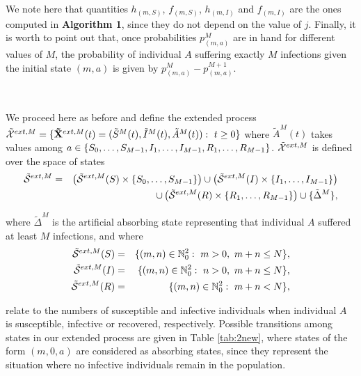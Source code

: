 \documentclass[preprint,12pt]{elsarticle}
\begin{document}
\par\noindent We note here that quantities $h_{(m,S)}$, $f_{(m,S)}$, $h_{(m,I)}$ and $f_{(m,I)}$ are the ones computed in {\bf Algorithm 1}, since they do not depend
on the value of $j$. Finally, it is worth to point out that, once probabilities $p^M_{(m,a)}$ are in hand for different values of $M$, the probability
of individual $A$ suffering exactly $M$ infections given the initial state $(m,a)$ is given by $p^M_{(m,a)}-p^{M+1}_{(m,a)}$.\\

\vspace{0.5cm}

\par{}\\

\par We proceed here as before and define the extended process ${\cal \tilde X}^{ext,M}=\{{\bf \tilde X}^{ext,M}(t)=({\tilde S}^M(t),{\tilde I}^M(t),{\tilde A}^M(t)):\ t\geq0\}$ where
${\tilde A}^M(t)$ takes values among $a\in\{S_0,\dots,S_{M-1},I_1,\dots,I_{M-1},\linebreak R_1,\dots,R_{M-1}\}$. ${\cal \tilde X}^{ext,M}$ is defined over the
space of states
\begin{eqnarray*}
 {\cal \tilde S}^{ext,M} &=& \left({\cal \tilde S}^{ext,M}(S)\times\{S_0,\dots,S_{M-1}\}\right)\cup\left({\cal \tilde S}^{ext,M}(I)\times\{I_1,\dots,I_{M-1}\}\right)\\
 &&\cup\left({\cal \tilde S}^{ext,M}(R)\times\{R_1,\dots,R_{M-1}\}\right)\cup\{{\tilde \Delta}^M\},
\end{eqnarray*}
\par\noindent where ${\tilde \Delta}^M$ is the artificial absorbing state representing that individual $A$ suffered at least $M$ infections, and
where
\begin{eqnarray*}
 {\cal \tilde S}^{ext,M}(S) &=& \{(m,n)\in\mathbb{N}_0^2:\ m>0,\ m+n\leq N\},\\
{\cal \tilde S}^{ext,M}(I) &=& \{(m,n)\in\mathbb{N}_0^2:\ n>0,\ m+n\leq N\},\\
{\cal \tilde S}^{ext,M}(R) &=& \{(m,n)\in\mathbb{N}_0^2:\ m+n<N\},
\end{eqnarray*}

\par\noindent relate to the numbers of susceptible and infective individuals when individual $A$ is susceptible, infective or recovered, respectively.
Possible transitions among states in our extended process are given in Table \ref{tab:2new}, where states of the form $(m,0,a)$ are considered as
absorbing states, since they represent the situation where no infective individuals remain in the population.
\end{document}
